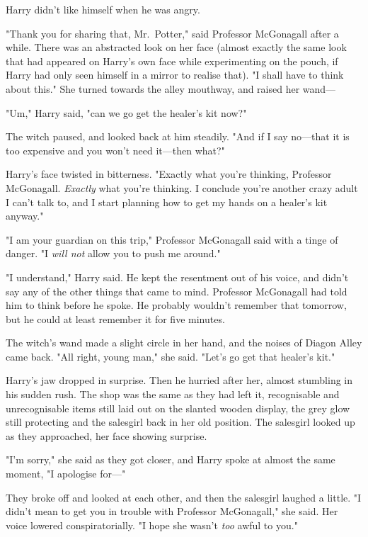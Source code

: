 Harry didn't like himself when he was angry.

"Thank you for sharing that, Mr.~Potter," said Professor McGonagall after a
while. There was an abstracted look on her face (almost exactly the same look
that had appeared on Harry's own face while experimenting on the pouch, if
Harry had only seen himself in a mirror to realise that). "I shall have to
think about this." She turned towards the alley mouthway, and raised her wand—

"Um," Harry said, "can we go get the healer's kit now?"

The witch paused, and looked back at him steadily. "And if I say no—that it
is too expensive and you won't need it—then what?"

Harry's face twisted in bitterness. "Exactly what you're thinking, Professor
McGonagall. \emph{Exactly} what you're thinking. I conclude you're another
crazy adult I can't talk to, and I start planning how to get my hands on a
healer's kit anyway."

"I am your guardian on this trip," Professor McGonagall said with a tinge of
danger. "I \emph{will not} allow you to push me around."

"I understand," Harry said. He kept the resentment out of his voice, and didn't
say any of the other things that came to mind. Professor McGonagall had told
him to think before he spoke. He probably wouldn't remember that tomorrow, but
he could at least remember it for five minutes.

The witch's wand made a slight circle in her hand, and the noises of Diagon
Alley came back. "All right, young man," she said. "Let's go get that healer's
kit."

Harry's jaw dropped in surprise. Then he hurried after her, almost stumbling in
his sudden rush.
\sbreak
The shop was the same as they had left it, recognisable and unrecognisable
items still laid out on the slanted wooden display, the grey glow still
protecting and the salesgirl back in her old position. The salesgirl looked up
as they approached, her face showing surprise.

"I'm sorry," she said as they got closer, and Harry spoke at almost the same
moment, "I apologise for—"

They broke off and looked at each other, and then the salesgirl laughed a
little. "I didn't mean to get you in trouble with Professor McGonagall," she
said. Her voice lowered conspiratorially. "I hope she wasn't \emph{too} awful
to you."

